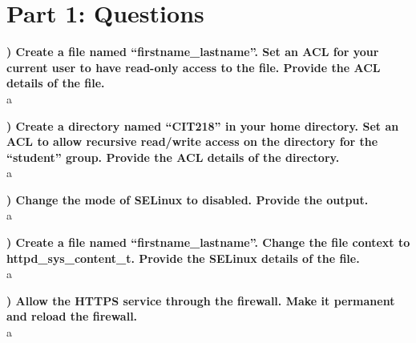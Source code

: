 \documentclass{report}
\title{\classinfo}
\author{\semester}
\date{\today}
\newcommand{\mysection}[1]{\section*{#1}}
\newcommand{\mysubsection}[2]{\textbf{\romannumeral #1) #2}}
\begin{document}
\maketitle

\mysection{\textbf{Part 1: Questions}}


\mysubsection{1}{Create a file named “firstname_lastname”. Set an ACL for your current user to have read-only access to the file. Provide the ACL details of the file.}\\
a


\noindent\mysubsection{2}{Create a directory named “CIT218” in your home directory. Set an ACL to allow recursive read/write access on the directory for the “student” group. Provide the ACL details of the directory.}\\
a


\noindent\mysubsection{3}{Change the mode of SELinux to disabled. Provide the output.}\\
a



\noindent\mysubsection{4}{Create a file named “firstname_lastname”. Change the file context to httpd_sys_content_t.  Provide the SELinux details of the file.}\\
a



\noindent\mysubsection{5}{Allow the HTTPS service through the firewall. Make it permanent and reload the firewall. }\\
a


\end{document}
